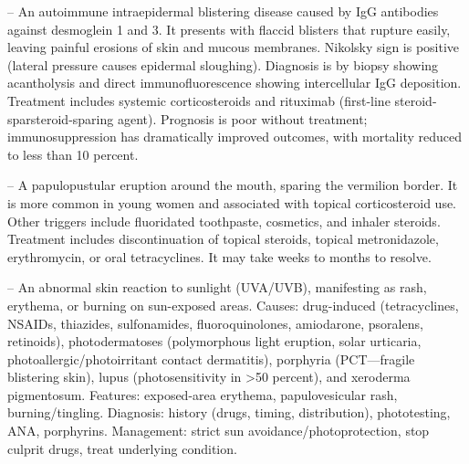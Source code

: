 -- An autoimmune intraepidermal blistering disease caused by IgG antibodies against desmoglein 1 and 3. It presents with flaccid blisters that rupture easily, leaving painful erosions of skin and mucous membranes. Nikolsky sign is positive (lateral pressure causes epidermal sloughing). Diagnosis is by biopsy showing acantholysis and direct immunofluorescence showing intercellular IgG deposition. Treatment includes systemic corticosteroids and rituximab (first-line steroid-sparsteroid-sparing agent). Prognosis is poor without treatment; immunosuppression has dramatically improved outcomes, with mortality reduced to less than 10 percent.

-- A papulopustular eruption around the mouth, sparing the vermilion border. It is more common in young women and associated with topical corticosteroid use. Other triggers include fluoridated toothpaste, cosmetics, and inhaler steroids. Treatment includes discontinuation of topical steroids, topical metronidazole, erythromycin, or oral tetracyclines. It may take weeks to months to resolve.

-- An abnormal skin reaction to sunlight (UVA/UVB), manifesting as rash, erythema, or burning on sun-exposed areas. Causes: drug-induced (tetracyclines, NSAIDs, thiazides, sulfonamides, fluoroquinolones, amiodarone, psoralens, retinoids), photodermatoses (polymorphous light eruption, solar urticaria, photoallergic/photoirritant contact dermatitis), porphyria (PCT—fragile blistering skin), lupus (photosensitivity in >50 percent), and xeroderma pigmentosum. Features: exposed-area erythema, papulovesicular rash, burning/tingling. Diagnosis: history (drugs, timing, distribution), phototesting, ANA, porphyrins. Management: strict sun avoidance/photoprotection, stop culprit drugs, treat underlying condition.


